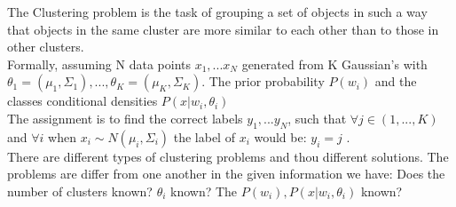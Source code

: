 \documentclass[12pt, a4paper]{paper}
\begin{document}
The Clustering problem is the task of grouping a set of objects in such a way that objects in the same cluster are more similar to each other than to those in other clusters. \\
Formally, assuming N data points $x_{1}, ... x_{N}$ generated from K Gaussian's with $\theta_{1} = (\mu_{1}, \Sigma_{1}), ... , \theta_{K} = (\mu_{K}, \Sigma_{K})$. The prior probability $P(w_{i})$ and the classes conditional densities $P(x|w_{i}, \theta_{i})$\\
The assignment is to find the correct labels $y_{1}, ... y_{N}$, such that $\forall j \in (1,...,K)$ and  $\forall i$ when $x_{i} \sim N(\mu_{i}, \Sigma_{i})$ the label of $x_{i}$ would be: $y_{i} = j$ .\\ 

There are different types of clustering problems and thou different solutions.
The problems are differ from one another in the given information we have:
Does the number of clusters known? $\theta_{i}$ known? The $P(w_{i}), P(x|w_{i}, \theta_{i})$ known? \\ 
\end{document}
